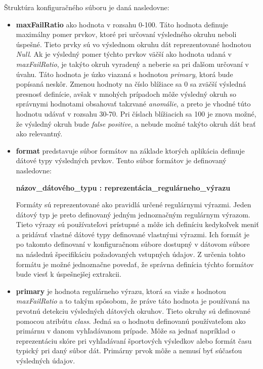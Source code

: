\bigskip

Štruktúra konfiguračného súboru je daná nasledovne:

\begin{itemize}
  \item \textbf{maxFailRatio} ako hodnota v rozsahu 0-100. Táto hodnota definuje maximálny pomer prvkov, ktoré pri určovaní výsledného okruhu neboli úspešné. Tieto prvky sú vo výslednom okruhu dát reprezentované hodnotou \textit{Null}. Ak je výsledný pomer týchto prvkov väčší ako hodnota udaná v \textit{maxFailRatio}, je takýto okruh vyradený a neberie sa pri ďalšom určovaní v úvahu. Táto hodnota je úzko viazaná s hodnotou \textit{primary}, ktorá bude popísaná neskôr. Zmenou hodnoty na číslo blížiace sa 0 sa zväčší výsledná presnosť definície, avšak v mnohých prípadoch môže výsledný okruh so správnymi hodnotami obsahovať takzvané \textit{anomálie}, a preto je vhodné túto hodnotu udávať v rozsahu 30-70. Pri číslach blížiacich sa 100 je znova možné, že výsledný okruh bude \textit{false positive}, a nebude možné takýto okruh dát brať ako relevantný.
  \item \textbf{format} predstavuje súbor formátov na základe ktorých aplikácia definuje dátové typy výsledných prvkov. Tento súbor formátov je definovaný nasledovne:
  
  \textbf{názov\_dátového\_typu : reprezentácia\_regulárneho\_výrazu}
  
  Formáty sú reprezentované ako pravidlá určené regulárnymi výrazmi. Jeden  dátový typ je preto definovaný jedným jednoznačným regulárnym výrazom. Tieto výrazy sú používateľovi prístupné a môže ich definíciu kedykoľvek meniť a pridávať vlastné dátové typy definované vlastnými výrazmi. Ich formát je po takomto definovaní v konfiguračnom súbore dostupný v dátovom súbore na následnú špecifikáciu požadovaných vstupných údajov. Z určenia tohto formátu je možné jednoznačne povedať, že správna definícia týchto formátov bude viesť k úspešnejšej extrakcii. 
  
  \item \textbf{primary} je hodnota regulárneho výrazu, ktorá sa viaže s hodnotou \textit{maxFailRatio} a to takým spôsobom, že práve táto hodnota je používaná na prvotnú detekciu výsledných dátových okruhov. Tieto okruhy sú definované pomocou atribútu \textit{class}. Jedná sa o hodnotu definovanú používateľom ako primárnu v danom vyhľadávanom prípade. Môže sa jednať napríklad o reprezentáciu skóre pri vyhľadávaní športových výsledkov alebo formát času typický pri daný súbor dát. Primárny prvok môže a nemusí byť súčasťou výsledných údajov.
\end{itemize}

